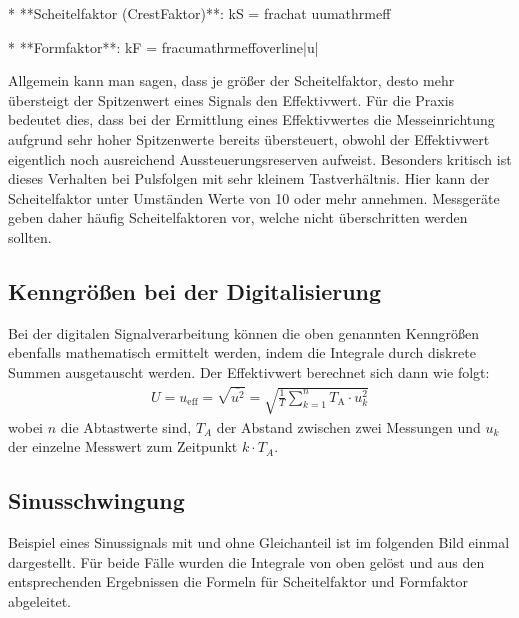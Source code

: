 \documentclass[letterpaper,10pt,english]{jupyterBook}
\begin{document}
\begin{sphinxVerbatim}[commandchars=\\\{\}]
* **Scheitelfaktor (Crest\PYGZhy{}Faktor)**: 
\PYGZdl{}\PYGZdl{}k\PYGZus{}S = \PYGZbs{}frac\PYGZob{}\PYGZbs{}hat u\PYGZcb{}\PYGZob{}u\PYGZus{}\PYGZbs{}mathrm\PYGZob{}eff\PYGZcb{}\PYGZcb{}\PYGZdl{}\PYGZdl{}

* **Formfaktor**: 
\PYGZdl{}\PYGZdl{}k\PYGZus{}F = \PYGZbs{}frac\PYGZob{}u\PYGZus{}\PYGZbs{}mathrm\PYGZob{}eff\PYGZcb{}\PYGZcb{}\PYGZob{}\PYGZbs{}overline\PYGZob{}|u|\PYGZcb{}\PYGZcb{}\PYGZdl{}\PYGZdl{}
\end{sphinxVerbatim}

\sphinxAtStartPar
Allgemein kann man sagen, dass je größer der Scheitelfaktor, desto mehr übersteigt der Spitzenwert eines Signals den Effektivwert. Für die Praxis bedeutet dies, dass bei der Ermittlung eines Effektivwertes die Messeinrichtung aufgrund sehr hoher Spitzenwerte bereits übersteuert, obwohl der Effektivwert eigentlich noch ausreichend Aussteuerungsreserven aufweist. Besonders kritisch ist dieses Verhalten bei Pulsfolgen mit sehr kleinem Tastverhältnis. Hier kann der Scheitelfaktor unter Umständen Werte von 10 oder mehr annehmen. Messgeräte geben daher häufig Scheitelfaktoren vor, welche nicht überschritten werden sollten.


\subsection{Kenngrößen bei der Digitalisierung}
\label{\detokenize{content/3_Kenngroessen:kenngroszen-bei-der-digitalisierung}}
\sphinxAtStartPar
Bei der digitalen Signalverarbeitung können die oben genannten Kenngrößen ebenfalls mathematisch ermittelt werden, indem die Integrale durch diskrete Summen ausgetauscht werden. Der Effektivwert berechnet sich dann wie folgt:
\begin{equation*}
\begin{split}U = u_\mathrm{eff} = \sqrt{\overline{u^2}} = \sqrt{\frac{1}{T}\sum_{k = 1}^{n}T_\mathrm A \cdot  u_k^2}\end{split}
\end{equation*}
\sphinxAtStartPar
wobei \(n\) die Abtastwerte sind, \(T_A\) der Abstand zwischen zwei Messungen und \(u_k\) der einzelne Messwert zum Zeitpunkt \(k\cdot T_A\).

\sphinxAtStartPar
{}


\subsection{Sinusschwingung}
\label{\detokenize{content/3_Kenngroessen:sinusschwingung}}
\sphinxAtStartPar
Beispiel eines Sinussignals mit und ohne Gleichanteil ist im folgenden Bild einmal dargestellt. Für beide Fälle wurden die Integrale von oben gelöst und aus den entsprechenden Ergebnissen die Formeln für Scheitelfaktor und Formfaktor abgeleitet.
\end{document}
